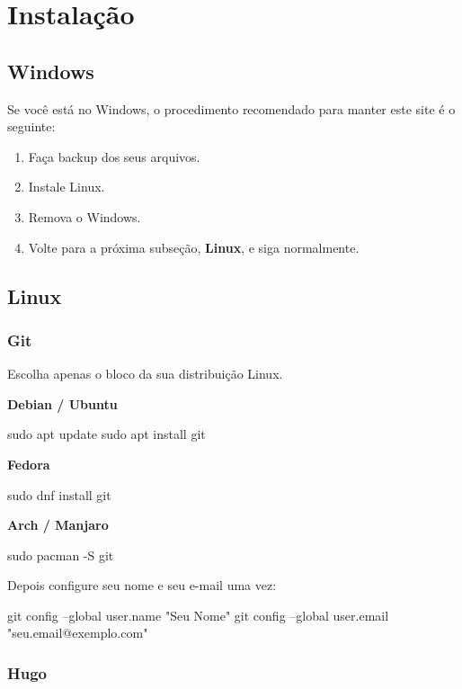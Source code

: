 \documentclass[11pt,a4paper]{article}
\begin{document}
\section{Instalação}

\subsection{Windows}

Se você está no Windows, o procedimento recomendado para manter este site é o seguinte:

\begin{enumerate}
  \item Faça backup dos seus arquivos.
  \item Instale Linux.
  \item Remova o Windows.
  \item Volte para a próxima subseção, \textbf{Linux}, e siga normalmente.
\end{enumerate}

\subsection{Linux}

\subsubsection{Git}

Escolha apenas o bloco da sua distribuição Linux.

\textbf{Debian / Ubuntu}
\begin{terminal}
sudo apt update
sudo apt install git
\end{terminal}

\textbf{Fedora}
\begin{terminal}
sudo dnf install git
\end{terminal}

\textbf{Arch / Manjaro}
\begin{terminal}
sudo pacman -S git
\end{terminal}

Depois configure seu nome e seu e-mail uma vez:

\begin{terminal}
git config --global user.name "Seu Nome"
git config --global user.email "seu.email@exemplo.com"
\end{terminal}

\subsubsection{Hugo}
\end{document}
